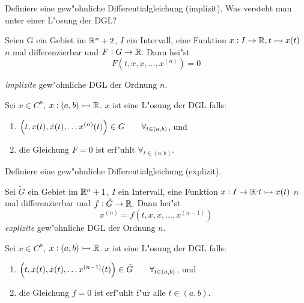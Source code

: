 \documentclass[9pt]{article}
\newcommand{\R}[1]{%
	\ifthenelse{\equal{#1}{}}
		{\mathbb{R}}
		{\mathbb{R}^#1}}%
\newenvironment{field}{}{\newpage}
\newif\ifnote
\newenvironment{note}{\notetrue}{\notefalse}
\newcommand{\localtag}{}
\newcommand{\globaltag}{}
\newcommand{\uuid}{}
\newcommand{\tags}[1]{
    \ifnote 
        \renewcommand{\localtag}{#1}
    \else
        \renewcommand{\globaltag}{#1}
    \fi 
    }
\newcommand{\xplain}[1]{\renewcommand{\uuid}{#1}}
\begin{document}

\tags{mathe2::1sem::GDGL}

\begin{note}
	\xplain{UUID}  %
	\tags{definition, 3.1.1, 3.1.2}
	
	\begin{field}  %
		Definiere  eine gew"ohnliche Differentialgleichung (implizit).
		Was versteht man unter einer L"osung der DGL?
	\end{field}  
	
	\begin{field}  %
		Seien G ein Gebiet im $\R{n+2}$, $I$ ein Intervall, eine Funktion $x: I \rightarrow \R{}, 
		t\rightarrowtail x(t)$ $n$ mal differenzierbar und $F: G \rightarrow \R{}$.
		Dann hei"st
		\begin{equation*}
			F(t,x,\dot{x}, \dots, x^{(n)}) = 0
		\end{equation*}
		
		\textit{implizite} gew"ohnliche DGL der Ordnung $n$. 
		
		Sei $x\in C^n$, $x: (a,b) \rightarrowtail \R{}$.  $x$ ist eine L"osung der DGL falls:
		\begin{enumerate}
			\item $\qty(t,x(t), \dot{x}(t), \dots x^{(n)}(t)) \in G \qquad \forall_{t\in (a,b)}$, und
			\item die Gleichung $F=0$ ist erf"uhlt $\forall_{t\in (a,b)}$.
		\end{enumerate}
	\end{field}
	
	\begin{field}  %
		Definiere  eine gew"ohnliche Differentialgleichung (explizit).
	\end{field}  
	
	\begin{field}  %
				Sei $\tilde{G}$ ein Gebiet im $\R{n+1}$,  $I$ ein Intervall, eine Funktion $x: I \rightarrow \R, 
		t\rightarrowtail x(t)$ $n$ mal differenzierbar und $f: \tilde{G} \rightarrow \R{}.$
		Dann hei"st
		\begin{equation*}
			x^{(n)} = f(t,x,\dot{x}, \dots, x^{(n-1)})
		\end{equation*}
		\textit{explizite}  gew"ohnliche DGL der Ordnung $n$.
		
		Sei $x\in C^n$, $x: (a,b) \rightarrowtail \R{}$.  $x$ ist eine L"osung der DGL falls:
		\begin{enumerate}
			\item $\qty(t,x(t), \dot{x}(t), \dots x^{(n-1)}(t)) \in \tilde{G} \qquad \forall_{t\in (a,b)}$, und
			\item die Gleichung $f=0$ ist erf"uhlt f"ur alle $t\in (a,b)$.
		\end{enumerate}
	\end{field}
\end{note}
\end{document}
